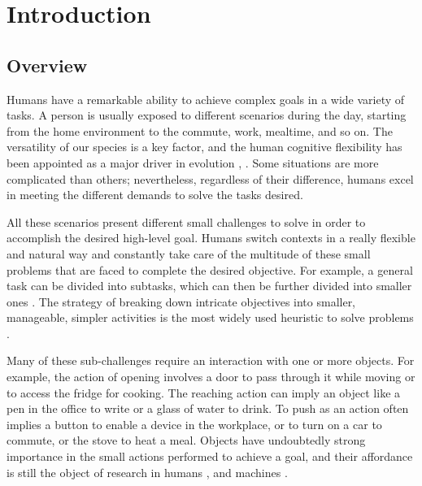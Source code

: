 \chapter{Introduction}
\label{chap:introduction}

\section{Overview}
Humans have a remarkable ability to achieve complex goals in a wide variety of tasks. A person is usually exposed to different scenarios during the day, starting from the home environment to the commute, work, mealtime, and so on. The versatility of our species is a key factor, and the human cognitive flexibility has been appointed as a major driver in evolution \cite{deak2003development}, \cite{karmiloff1994beyond}. Some situations are more complicated than others; nevertheless, regardless of their difference, humans excel in meeting the different demands to solve the tasks desired.

All these scenarios present different small challenges to solve in order to accomplish the desired high-level goal. Humans switch contexts in a really flexible and natural way and constantly take care of the multitude of these small problems that are faced to complete the desired objective.
For example, a general task can be divided into subtasks, which can then be further divided into smaller ones \cite{kroemer2021review}.
The strategy of breaking down intricate objectives into smaller, manageable, simpler activities is the most widely used heuristic to solve problems \cite{egidi2006decomposition}.

Many of these sub-challenges require an interaction with one or more objects. For example, the action of opening involves a door to pass through it while moving or to access the fridge for cooking. The reaching action can imply an object like a pen in the office to write or a glass of water to drink. To push as an action often implies a button to enable a device in the workplace, or to turn on a car to commute, or the stove to heat a meal. 
Objects have undoubtedly strong importance in the small actions performed to achieve a goal, and their affordance is still the object of research in humans \cite{maranesi2014cortical}, \cite{osiurak2017affordance} and machines \cite{horton2012affordances}.

